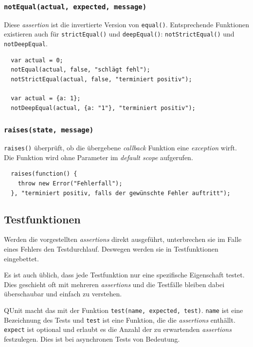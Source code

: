 \documentclass[11pt, a4paper]{article}
\begin{document}
\subsubsection*{\texttt{notEqual(actual, expected, message)}}

Diese \emph{assertion} ist die invertierte Version von \texttt{equal()}.
Entsprechende Funktionen existieren auch für \texttt{strictEqual()} und
\texttt{deepEqual()}: \texttt{notStrictEqual()} und \texttt{notDeepEqual}.

\begin{verbatim}
  var actual = 0;
  notEqual(actual, false, "schlägt fehl");
  notStrictEqual(actual, false, "terminiert positiv");

  var actual = {a: 1};
  notDeepEqual(actual, {a: "1"}, "terminiert positiv");
\end{verbatim}

\subsubsection*{\texttt{raises(state, message)}}

\texttt{raises()} überprüft, ob die übergebene \emph{callback} Funktion eine
\emph{exception} wirft. Die Funktion wird ohne Parameter im \emph{default scope}
aufgerufen.

\begin{verbatim}
  raises(function() {
    throw new Error("Fehlerfall");
  }, "terminiert positiv, falls der gewünschte Fehler auftritt");
\end{verbatim}

\subsection{Testfunktionen}

Werden die vorgestellten \emph{assertions} direkt ausgeführt, unterbrechen sie
im Falle eines Fehlers den Testdurchlauf. Deswegen werden sie in Testfunktionen
eingebettet.

Es ist auch üblich, dass jede Testfunktion nur eine spezifische Eigenschaft
testet. Dies geschieht oft mit mehreren \emph{assertions} und die Testfälle
bleiben dabei überschaubar und einfach zu verstehen.

QUnit macht das mit der Funktion \texttt{test(name, expected, test)}.
\texttt{name} ist eine Bezeichnung des Tests und \texttt{test} ist eine
Funktion, die die \emph{assertions} enthällt. \texttt{expect} ist optional und
erlaubt es die Anzahl der zu erwartenden \emph{assertions} festzulegen. Dies ist
bei asynchronen Tests von Bedeutung.
\end{document}
